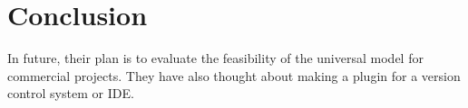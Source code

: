 
\section{Conclusion}
In future, their plan is to evaluate the feasibility of the universal
model for commercial projects. They have also thought about making a plugin for a version control system or IDE.





